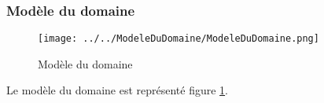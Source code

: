 \subsubsection{Modèle du domaine}
\begin{figure}
  \centering
      \texttt{[image: ../../ModeleDuDomaine/ModeleDuDomaine.png]} %
\caption{Modèle du domaine}
\label{ModeleDuDomaine}
\end{figure}

Le modèle du domaine est représenté figure \ref{ModeleDuDomaine}.
